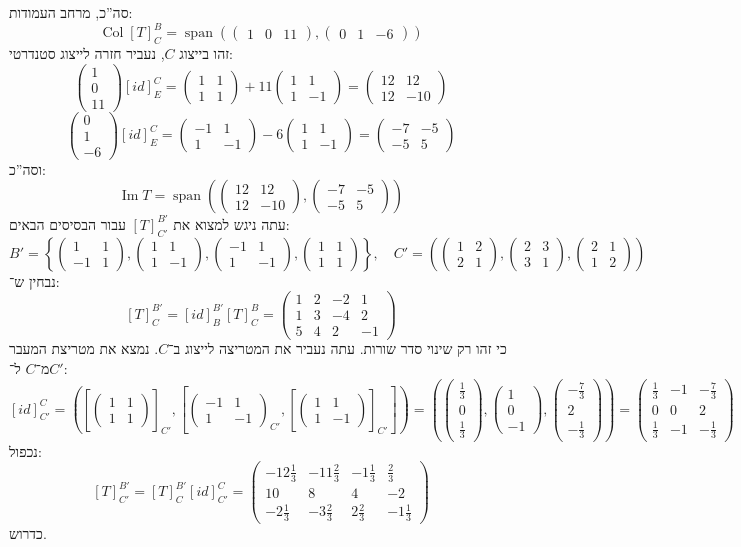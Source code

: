 \documentclass[]{article}
\DeclareMathOperator\Img   {Im}
\DeclareMathOperator{\Sp}     {span}
\DeclareMathOperator{\col}    {Col}
\newcommand\pms[1]    {\begin{pmatrix}
        #1
\end{pmatrix}}
\newcommand\cl [1]    {\left ( #1 \right )}
\newcommand\csb[1]    {\left [ #1 \right ]}
\newcommand\ccb[1]    {\left \{ #1 \right \}}
\theoremstyle{definition}
\begin{document}
     סה''כ, מרחב העמודות: 
     \[ \col [T]^{B}_C = \Sp\cl{\pms{1 & 0 & 11}, \pms{0 & 1 & -6}} \]
     זהו בייצוג $C$, נעביר חזרה לייצוג סטנדרטי: 
     \[ \pms{1 \\ 0 \\ 11}[id]^{C}_{E} = \pms{1 & 1 \\ 1 & 1} + 11\pms{1 & 1 \\ 1 & -1} = \pms{12 & 12 \\ 12 & -10} \]
     \[ \pms{0 \\ 1 \\ -6}[id]^{C}_E = \pms{-1 & 1 \\ 1 & -1} - 6\pms{1 & 1 \\ 1 & -1} = \pms{-7 & -5 \\ -5 & 5} \]
     וסה''כ: 
     \[ \Img T = \Sp\cl{\pms{12 & 12 \\ 12 & -10}, \pms{-7 & -5 \\ -5 & 5}} \]
     עתה ניגש למצוא את $[T]^{B'}_{C'}$ עבור הבסיסים הבאים:  
     \[ B' = \ccb{\pms{1 & 1 \\ -1 & 1}  ,\pms{1 & 1 \\ 1 & -1} ,\pms{-1 & 1 \\ 1 & -1},\pms{1 & 1 \\ 1 & 1}}, \quad C' = \cl{\pms{1 & 2 \\ 2 & 1}, \pms{2 & 3 \\ 3 & 1}, \pms{2 &1 \\ 1 & 2}} \]
     נבחין ש־: 
     \[ [T]^{B'}_{C} = [id]^{B'}_{B}[T]^{B}_{C} = \pms{1&2&-2&1 \\ 1&3&-4&2 \\ 5&4&2&-1} \]
     כי זהו רק שינוי סדר שורות. עתה נעביר את המטריצה לייצוג ב־$C$. נמצא את מטריצת המעבר מ־$C$ ל־$C'$:
     \[ [id]^{C}_{C'} = \cl{\csb{\pms{1 & 1 \\ 1 & 1}}_{C'}, \csb{\pms{-1 & 1 \\ 1 & -1}_{C'}, \csb{\pms{1 & 1 \\ 1 & -1}}_{C'}}} = \cl{\pms{\frac{1}{3} \\ 0 \\ \frac{1}{3}}, \pms{1 \\ 0 \\ -1}, \pms{-\frac{7}{3} \\ 2 \\ -\frac{1}{3}}} = \pms{\frac{1}{3} & -1 & -\frac{7}{3} \\ 0 & 0& 2 \\ \frac{1}{3} & -1 & -\frac{1}{3}} \]
     נכפול: 
     \[ [T]^{B'}_{C'} = [T]^{B'}_C[id]^{C}_{C'} = \pms{-12\frac{1}{3} & -11\frac{2}{3} & -1\frac{1}{3} & \frac{2}{3} \\ 10 & 8 & 4 & -2 \\ -2\frac{1}{3} & -3\frac{2}{3}& 2\frac{2}{3} & -1\frac{1}{3}} \]
     כדרוש. 
     
\end{document}

